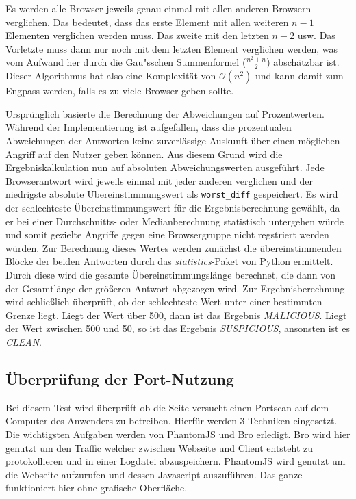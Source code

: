 Es werden alle Browser jeweils genau einmal mit allen anderen Browsern verglichen.
Das bedeutet, dass das erste Element mit allen weiteren $n-1$ Elementen verglichen werden muss. Das zweite mit den letzten $n-2$ usw.
Das Vorletzte muss dann nur noch mit dem letzten Element verglichen werden, was vom Aufwand her
durch die Gau"sschen Summenformel ($\frac{n^2+n}{2}$) abschätzbar ist.
Dieser Algorithmus hat also eine Komplexität von $\mathcal{O}(n^2)$ und kann damit zum Engpass werden, falls es zu viele Browser geben sollte.

Ursprünglich basierte die Berechnung der Abweichungen auf Prozentwerten.
Während der Implementierung ist aufgefallen, dass die prozentualen Abweichungen der Antworten keine
zuverlässige Auskunft über einen möglichen Angriff auf den Nutzer geben können.
Aus diesem Grund wird die Ergebniskalkulation nun auf absoluten Abweichungswerten ausgeführt.
Jede Browserantwort wird jeweils einmal mit jeder anderen verglichen und der niedrigste absolute
Übereinstimmungswert als \lstinline[style=eclipse]{worst_diff} gespeichert.
Es wird der schlechteste Übereinstimmungswert für die Ergebnisberechnung gewählt, da er bei einer Durchschnitts- oder Medianberechnung  statistisch untergehen würde und somit gezielte Angriffe gegen eine Browsergruppe nicht regstriert werden würden.
Zur Berechnung dieses Wertes werden zunächst die übereinstimmenden Blöcke der beiden Antworten durch das \textit{statistics}-Paket von Python ermittelt.
Durch diese wird die gesamte Übereinstimmungslänge berechnet, die dann von der Gesamtlänge der größeren Antwort abgezogen wird.
Zur Ergebnisberechnung wird schließlich überprüft, ob der schlechteste Wert unter einer bestimmten Grenze liegt.
Liegt der Wert über 500, dann ist das Ergebnis \textit{MALICIOUS}.
Liegt der Wert zwischen 500 und 50, so ist das Ergebnis \textit{SUSPICIOUS}, ansonsten ist es \textit{CLEAN}.

\subsection{Überprüfung der Port-Nutzung}
Bei diesem Test wird überprüft ob die Seite versucht einen Portscan auf dem Computer des Anwenders
zu betreiben. Hierfür werden 3 Techniken eingesetzt. Die wichtigsten Aufgaben werden von PhantomJS
und Bro erledigt.
Bro wird hier genutzt um den Traffic welcher zwischen Webseite
und Client entsteht zu protokollieren und in einer Logdatei abzuspeichern. PhantomJS wird genutzt
um die Webseite aufzurufen und dessen Javascript auszuführen. Das ganze funktioniert hier ohne
grafische Oberfläche.

